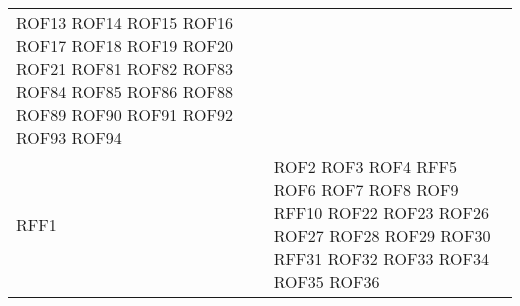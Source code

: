 \documentclass[../DefinizioneDiProdotto_v3.0.0.tex]{subfiles}
\begin{document}
\begin{longtable}{p{8.5cm}!{\VRule[1pt]}p{2.5cm}}
	ROF13 \newline
	ROF14 \newline
	ROF15 \newline
	ROF16 \newline
	ROF17 \newline
	ROF18 \newline
	ROF19 \newline
	ROF20 \newline
	ROF21 \newline
	ROF81 \newline
	ROF82 \newline
	ROF83 \newline
	ROF84 \newline
	ROF85 \newline
	ROF86 \newline
	ROF88 \newline
	ROF89 \newline
	ROF90 \newline
	ROF91 \newline
	ROF92 \newline
	ROF93 \newline
	ROF94 \\
	RFF1 \newline                      & 
	ROF2 \newline
	ROF3 \newline
	ROF4 \newline
	RFF5 \newline
	ROF6 \newline
	ROF7 \newline
	ROF8 \newline
	ROF9 \newline
	RFF10 \newline
	ROF22 \newline
	ROF23 \newline
	ROF26 \newline
	ROF27 \newline
	ROF28 \newline
	ROF29 \newline
	ROF30 \newline
	RFF31 \newline
	ROF32 \newline
	ROF33 \newline
	ROF34 \newline
	ROF35 \newline
	ROF36 \newline

\end{longtable}
\end{document}
